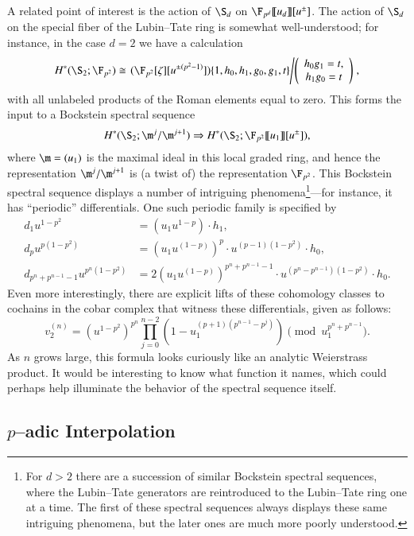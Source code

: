 A related point of interest is the action of $\S_d$ on $\F_{p^d}\ps{u_d}[u^\pm]$.  The action of $\S_d$ on the special fiber of the Lubin--Tate ring is somewhat well-understood; for instance, in the case $d = 2$ we have a calculation \[H^*(\S_2; \F_{p^2}) \cong \left.(\F_{p^2}[\zeta][u^{\pm(p^2-1)}])\{1, h_0, h_1, g_0, g_1, t\}\middle/\left(\begin{array}{c} h_0 g_1 = t, \\ h_1 g_0 = t \end{array}\right)\right. ,\] with all unlabeled products of the Roman elements equal to zero.  This forms the input to a Bockstein spectral sequence \[H^*(\S_2; \m^j / \m^{j+1}) \Rightarrow H^*(\S_2; \F_{p^2}\ps{u_1}[u^\pm]),\] where $\m = (u_1)$ is the maximal ideal in this local graded ring, and hence the representation $\m^j / \m^{j+1}$ is (a twist of) the representation $\F_{p^2}$.  This Bockstein spectral sequence displays a number of intriguing phenomena\footnote{For $d > 2$ there are a succession of similar Bockstein spectral sequences, where the Lubin--Tate generators are reintroduced to the Lubin--Tate ring one at a time.  The first of these spectral sequences always displays these same intriguing phenomena, but the later ones are much more poorly understood.}---for instance, it has ``periodic'' differentials.  One such periodic family is specified by
\begin{align*}
d_1 u^{1-p^2} & = (u_1 u^{1-p}) \cdot h_1, \\
d_p u^{p(1-p^2)} & = (u_1 u^{(1-p)})^p \cdot u^{(p-1)(1-p^2)} \cdot h_0, \\
d_{p^n+p^{n-1}-1} u^{p^n(1-p^2)} & = 2 (u_1 u^{(1-p)})^{p^n + p^{n-1} - 1} \cdot u^{(p^n - p^{n-1})(1 - p^2)} \cdot h_0.
\end{align*}
Even more interestingly, there are explicit lifts of these cohomology classes to cochains in the cobar complex that witness these differentials, given as follows: \[v_2^{(n)} = (u^{1-p^2})^{p^n} \prod_{j=0}^{n-2} \left(1 - u_1^{(p+1)(p^{n-1} - p^j)} \right) \pmod{u_1^{p^n + p^{n-1}}}.\]  As $n$ grows large, this formula looks curiously like an analytic Weierstrass product.  It would be interesting to know what function it names, which could perhaps help illuminate the behavior of the spectral sequence itself.





\subsection*{$p$--adic Interpolation}

